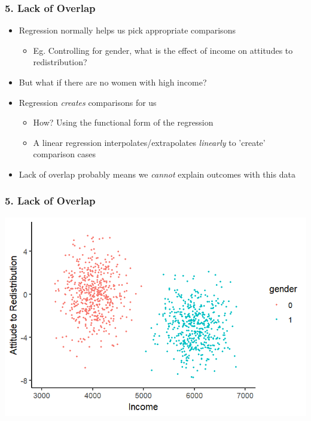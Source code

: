\documentclass[xcolor=x11names,compress]{beamer}\usepackage[]{graphicx}\usepackage[]{color}
\makeatletter
\def\maxwidth{ %
  \ifdim\Gin@nat@width>\linewidth
    \linewidth
  \else
    \Gin@nat@width
  \fi
}
\newenvironment{knitrout}{}{} %
\renewcommand{\(}{\begin{columns}}
\renewcommand{\)}{\end{columns}}
\newcommand{\<}[1]{\begin{column}{#1}}
\renewcommand{\>}{\end{column}}
\makeatother
\begin{document}
\begin{frame}
\frametitle{5. Lack of Overlap}
\begin{itemize}
\item Regression normally helps us pick appropriate comparisons
\begin{itemize}
\item Eg. Controlling for gender, what is the effect of income on attitudes to redistribution? 
\end{itemize}
\item But what if there are no women with high income?
\item Regression \textit{creates} comparisons for us
\begin{itemize}
\item How? Using the functional form of the regression
\item A linear regression interpolates/extrapolates \textit{linearly} to 'create' comparison cases
\end{itemize}
\item Lack of overlap probably means we \textit{cannot} explain outcomes with this data
\end{itemize}
\end{frame}

\begin{frame}
\frametitle{5. Lack of Overlap}
\begin{knitrout}
\color{fgcolor}
\includegraphics[width=\maxwidth]{figure/overlap1-1} 

\end{knitrout}
\end{frame}
\end{document}
